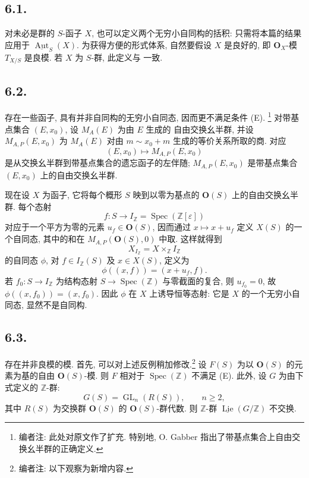 \subsection*{6.1.}
对未必是群的 \(S\)-函子 \(X\), 也可以定义两个无穷小自同构的括积:
只需将本篇的结果应用于 \(\underline{\operatorname{Aut}}_S(X)\).
为获得方便的形式体系, 自然要假设 \(X\) 是良好的, 即
\(\mathbf O_X\)-模 \(T_{X/S}\) 是良模.
若 \(X\) 为 \(S\)-群, 此定义与 一致.

\subsection*{6.2.}
存在一些函子, 具有并非自同构的无穷小自同态,
因而更不满足条件 (E).
\footnote{编者注: 此处对原文作了扩充.
特别地, O. Gabber 指出了带基点集合上自由交换幺半群的正确定义.}
对带基点集合 \((E,x_0)\), 设 \(M_A(E)\) 为由 \(E\) 生成的
自由交换幺半群, 并设 \(M_{A,P}(E,x_0)\) 为 \(M_A(E)\)
对由 \(m\sim x_0+m\) 生成的等价关系所取的商. 对应
\[
 (E,x_0)\longmapsto M_{A,P}(E,x_0)
\]
是从交换幺半群到带基点集合的遗忘函子的左伴随;
\(M_{A,P}(E,x_0)\) 是带基点集合 \((E,x_0)\) 上的自由交换幺半群.

现在设 \(X\) 为函子, 它将每个概形 \(S\) 映到以零为基点的
\(\mathbf O(S)\) 上的自由交换幺半群. 每个态射
\[
 f:S\longrightarrow I_{\mathbb Z}
   =\operatorname{Spec}(\mathbb Z[\varepsilon])
\]
对应于一个平方为零的元素 \(u_f\in\mathbf O(S)\), 因而通过
\(x\mapsto x+u_f\) 定义 \(X(S)\) 的一个自同态,
其中的和在 \(M_{A,P}(\mathbf O(S),0)\) 中取.
这样就得到
\[
 X_{I_{\mathbb Z}}=X\times_{\mathbb Z}I_{\mathbb Z}
\]
的自同态 \(\phi\), 对 \(f\in I_{\mathbb Z}(S)\) 及 \(x\in X(S)\), 定义为
\[
 \phi((x,f))=(x+u_f,f).
\]
若 \(f_0:S\to I_{\mathbb Z}\) 为结构态射
\(S\to\operatorname{Spec}(\mathbb Z)\) 与零截面的复合,
则 \(u_{f_0}=0\), 故 \(\phi((x,f_0))=(x,f_0)\).
因此 \(\phi\) 在 \(X\) 上诱导恒等态射:
它是 \(X\) 的一个无穷小自同态, 显然不是自同构.

\subsection*{6.3.}
存在并非良模的模. 首先, 可以对上述反例稍加修改.\footnote{编者注: 以下观察为新增内容.} 设 \(F(S)\) 为以 \(\mathbf O(S)\) 的元素为基的自由
\(\mathbf O(S)\)-模. 则 \(F\) 相对于
\(\operatorname{Spec}(\mathbb Z)\) 不满足 (E).
此外, 设 \(G\) 为由下式定义的 \(\mathbb Z\)-群:
\[
 G(S)=\operatorname{GL}_n(R(S)),\qquad n\geq2,
\]
其中 \(R(S)\) 为交换群 \(\mathbf O(S)\) 的
\(\mathbf O(S)\)-群代数. 则 \(\mathbb Z\)-群
\(\underline{\operatorname{Lie}}(G/\mathbb Z)\) 不交换.

